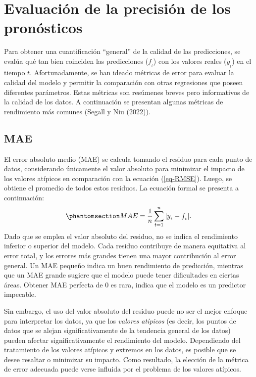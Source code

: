 \documentclass[
  us-letterpaper,
]{scrreprt}
\theoremstyle{plain}
\theoremstyle{definition}
\theoremstyle{definition}
\theoremstyle{plain}
\theoremstyle{remark}
\begin{document}
\section{Evaluación de la precisión de los
pronósticos}\label{evaluaciuxf3n-de-la-precisiuxf3n-de-los-pronuxf3sticos}

Para obtener una cuantificación ``general'' de la calidad de las
predicciones, se evalúa qué tan bien coinciden las predicciones
(\(f_{_t}\)) con los valores reales (\(y_{_t}\)) en el tiempo \(t\).
Afortunadamente, se han ideado métricas de error para evaluar la calidad
del modelo y permitir la comparación con otras regresiones que poseen
diferentes parámetros. Estas métricas son resúmenes breves pero
informativos de la calidad de los datos. A continuación se presentan
algunas métricas de rendimiento más comunes (Segall y Niu (2022)).

\subsection{MAE}\label{mae}

El error absoluto medio (MAE) se calcula tomando el residuo para cada
punto de datos, considerando únicamente el valor absoluto para minimizar
el impacto de los valores atípicos en comparación con la ecuación
(\ref{eq-RMSE}). Luego, se obtiene el promedio de todos estos residuos.
La ecuación formal se presenta a continuación:
\begin{equation}\phantomsection\label{eq-MAE}{MAE= \frac{1}{n}\sum_{t=1}^n |y_{_t}-f_{_t}|.}\end{equation}
Dado que se emplea el valor absoluto del residuo, no se indica el
rendimiento inferior o superior del modelo. Cada residuo contribuye de
manera equitativa al error total, y los errores más grandes tienen una
mayor contribución al error general. Un MAE pequeño indica un buen
rendimiento de predicción, mientras que un MAE grande sugiere que el
modelo puede tener dificultades en ciertas áreas. Obtener MAE perfecta
de 0 es rara, indica que el modelo es un predictor impecable.

Sin embargo, el uso del valor absoluto del residuo puede no ser el mejor
enfoque para interpretar los datos, ya que los \emph{valores atípicos}
(es decir, los puntos de datos que se alejan significativamente de la
tendencia general de los datos) pueden afectar significativamente el
rendimiento del modelo. Dependiendo del tratamiento de los valores
atípicos y extremos en los datos, es posible que se desee resaltar o
minimizar su impacto. Como resultado, la elección de la métrica de error
adecuada puede verse influida por el problema de los valores atípicos.
\end{document}
